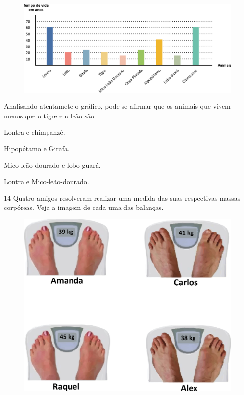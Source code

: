 \begin{figure}[htpb!]
\centering
\includegraphics[width=\textwidth]{./media/image112.png}
\end{figure}

Analisando atentamete o gráfico, pode-se afirmar que os animais que vivem menos que o tigre e o leão são

\begin{multicols}{2}[\setlength{\columnsep}{-1cm}]
\begin{escolha}
\item
  Lontra e chimpanzé.
\item
  Hipopótamo e Girafa.
\item
  Mico-leão-dourado e lobo-guará.
\item
  Lontra e Mico-leão-dourado.
\end{escolha}
\end{multicols}


\num{14} Quatro amigos resolveram realizar uma medida das suas respectivas massas corpóreas. Veja a imagem de cada uma das balanças.

\begin{figure}[htpb!]
\centering
\includegraphics[width=.8\textwidth]{./media/image113.png}
\end{figure}

